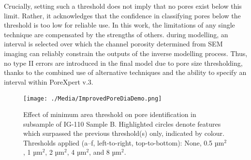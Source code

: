 \documentclass[review]{elsarticle}
\begin{document}
   Crucially, setting such a threshold does not imply that no pores exist below
   this limit. Rather, it acknowledges that the confidence in classifying pores
   below the threshold is too low for reliable use. In this work, the
   limitations of any single technique are compensated by the strengths of
   others. during modelling, an interval is selected over which the channel
   porosity determined from SEM imaging can reliably constrain the outputs of
   the inverse modelling process. Thus, no type II errors are introduced in the
   final model due to pore size thresholding, thanks to the combined use of
   alternative techniques and the ability to specify an interval within
   PoreXpert v.3.


   \begin{table}
  \centering
  \caption{Effect of different pore area thresholds on a subsection of IG-430F, showing the resulting pore count, total area, average pore size, and percentage area.}
  \label{tab:thresholdsandvariationsIG430F}
\end{table}

\begin{figure}[!htbp]
    \centering
    \texttt{[image: ./Media/ImprovedPoreDiaDemo.png]}
    \caption{Effect of minimum area threshold on pore identification in subsample of IG-110 Sample B. Highlighted circles denote features which surpassed the previous threshold(s) only, indicated by colour. Thresholds applied (a–f, left-to-right, top-to-bottom): None, 0.5 µm\(^2\), 1 µm\(^2\), 2 µm\(^2\), 4 µm\(^2\), and 8 µm\(^2\).}
    \label{fig:improvedporediademo}
\end{figure}
\end{document}
